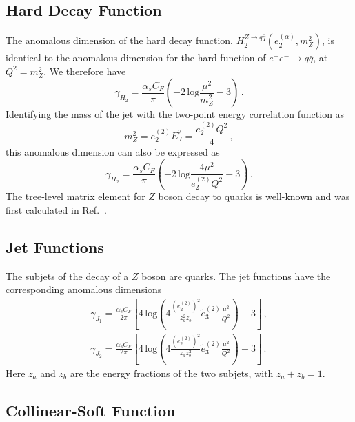 \documentclass[a4paper,11pt]{article}
\newcommand{\ecf}[2]{e_{#1}^{(#2)}}
\newcommand{\ecflp}[2]{\tilde e_{#1}^{(#2)}}
\def\log{\text{log}}
\DeclareRobustCommand{\Ref}[1]{Ref.~\cite{#1}}
\begin{document}
\subsection{Hard Decay Function}

The anomalous dimension of the hard decay function, $H_2^{Z\rightarrow q \bar q}(\ecf{2}{\alpha},m_Z^2)$, is identical to the anomalous dimension for the hard function of $e^+e^-\to q\bar q$, at $Q^2=m_Z^2$. We therefore have
\begin{equation}
\gamma_{H_2} = \frac{\alpha_sC_F}{\pi}\left(
-2\,\log\frac{\mu^2}{m_Z^2}-3
\right)\,.
\end{equation}
Identifying the mass of the jet with the two-point energy correlation function as
\begin{equation}
m_Z^2 =\ecf{2}{2}E_J^2 =\frac{\ecf{2}{2}Q^2}{4}\,,
\end{equation}
this anomalous dimension can also be expressed as
\begin{equation}
\gamma_{H_2} = \frac{\alpha_sC_F}{\pi}\left(
-2\,\log\frac{4\mu^2}{\ecf{2}{2}Q^2}-3
\right)\,.
\end{equation}
%
The tree-level matrix element for $Z$ boson decay to quarks is well-known and was first calculated in \Ref{Altarelli:1979ub}.

\subsection{Jet Functions}

The subjets of the decay of a $Z$ boson are quarks.  The jet functions have the corresponding anomalous dimensions
\begin{align}
\gamma_{J_1} = \frac{\alpha_s C_F}{2\pi}\left[
4\,  \log\left( 4\frac{\left(\ecf{2}{2}\right)^2}{z_a^2z_b}\ecflp{3}{2}\frac{\mu^2}{Q^2}  \right)+3
\right]\,,\\
\gamma_{J_2} = \frac{\alpha_s C_F}{2\pi}\left[
4\,  \log\left( 4\frac{\left(\ecf{2}{2}\right)^2}{z_az_b^2}\ecflp{3}{2}\frac{\mu^2}{Q^2}  \right)+3
\right]\,.
\end{align}
Here $z_a$ and $z_b$ are the energy fractions of the two subjets, with $z_a+z_b = 1$.

\subsection{Collinear-Soft Function}
\end{document}
